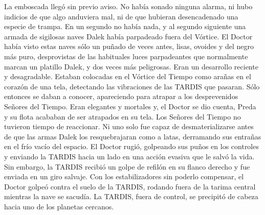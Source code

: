 La emboscada llegó sin previo aviso. No había sonado ninguna alarma, ni hubo indicios de que algo anduviera mal, ni de que hubieran desencadenado una especie de trampa. En un segundo no había nada, y al segundo siguiente una armada de sigilosas naves Dalek había parpadeado fuera del Vórtice.
El Doctor había visto estas naves sólo un puñado de veces antes, lisas, ovoides y del negro más puro, desprovistas de las habituales luces parpadeantes que normalmente marcan un platillo Dalek, y dos veces más peligrosas. Eran un desarrollo reciente y desagradable. Estaban colocadas en el Vórtice del Tiempo como arañas en el corazón de una tela, detectando las vibraciones de las TARDIS que pasaran. Sólo entonces se daban a conocer, apareciendo para atrapar a los desprevenidos Señores del Tiempo.
Eran elegantes y mortales y, el Doctor se dio cuenta, Preda y su flota acababan de ser atrapados en su tela.
Los Señores del Tiempo no tuvieron tiempo de reaccionar. Ni uno solo fue capaz de desmaterializarse antes de que las armas Dalek los resquebrajaran como a latas, derramando sus entrañas en el frío vacío del espacio.
El Doctor rugió, golpeando sus puños en los controles y enviando la TARDIS hacia un lado en una acción evasiva que le salvó la vida. Sin embargo, la TARDIS recibió un golpe de refilón en su flanco derecho y fue enviada en un giro salvaje. Con los estabilizadores sin poderlo compensar, el Doctor golpeó contra el suelo de la TARDIS, rodando fuera de la tarima central mientras la nave se sacudía.
La TARDIS, fuera de control, se precipitó de cabeza hacia uno de los planetas cercanos.

